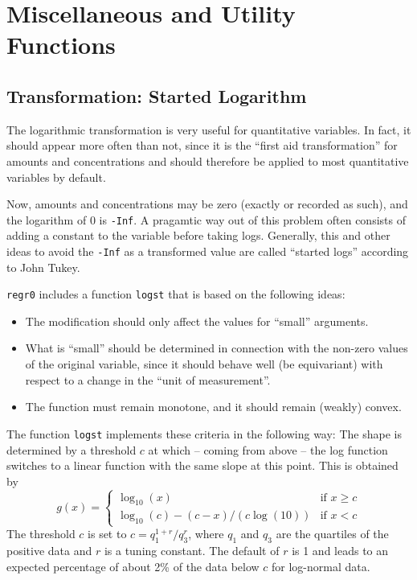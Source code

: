 \documentclass[11pt]{article}\usepackage[]{graphicx}\usepackage[]{color}
\begin{document}
\Vneed{50mm}
\section{Miscellaneous and Utility Functions}
\subsection{Transformation: Started Logarithm}
The logarithmic transformation is very useful for quantitative variables. 
In fact, it should appear more often than not, since it is the
``first aid transformation'' for amounts and concentrations and should
therefore be applied to most quantitative variables by default.

Now, amounts and concentrations may be zero (exactly or recorded as such),
and the logarithm of 0 is \texttt{-Inf}. 
A pragamtic way out of this problem often consists of adding a constant
to the variable before taking logs. 
Generally, this and other ideas to avoid the \texttt{-Inf} as a transformed
value are called ``started logs'' according to John Tukey.

\texttt{regr0} includes a function \texttt{logst} that is based on the
following ideas:
\begin{itemize}
\item 
The modification should only affect the values for ``small'' arguments.
\item
What is ``small'' should be determined in connection with the non-zero 
values of the original variable, since it should behave well (be
equivariant) with respect to a change in the ``unit of measurement''.
\item
The function must remain monotone, and it should remain (weakly) convex.
\end{itemize}

The function \texttt{logst} implements these criteria in the following way: 
The shape is determined by a threshold $c$ at which -- coming from above --
the log function switches to a linear function with the same slope at this
point. This is obtained by
$$
  g(x) = \left\{\begin{array}{ll}\log_{10}(x) & \mbox{if\ \ } x\ge c\\
         \log_{10}(c) - (c-x)/(c\log(10)) & \mbox{if\ \ } x< c
         \end{array}\right.
$$
The threshold $c$ is set to
$ c = q_1^{1+r}/q_3^r$, where $q_1$ and $q_3$ are the quartiles of the 
positive data and $r$ is a tuning constant. 
The default of $r$ is 1 and leads to an expected
percentage of about 2\% of the data below $c$ for log-normal data.
\end{document}

